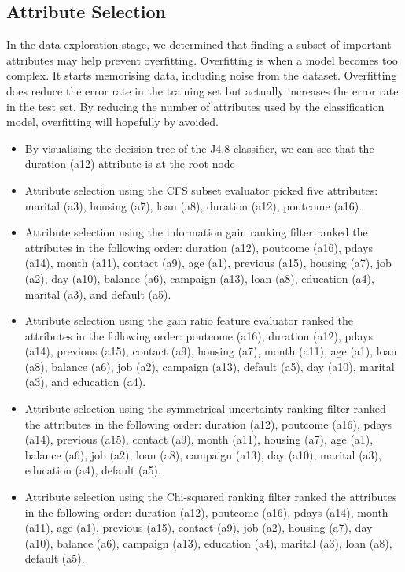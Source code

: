 \documentclass[a4paper,11pt]{article}
\begin{document}
\subsection{Attribute Selection}

In the data exploration stage, we determined that finding a subset of important attributes may help prevent overfitting.
Overfitting is when a model becomes too complex. It starts memorising data, including noise from the dataset. Overfitting
does reduce the error rate in the training set but actually increases the error rate in the test set. By reducing the
number of attributes used by the classification model, overfitting will hopefully by avoided.

\begin{itemize}
  \item{By visualising the decision tree of the J4.8 classifier, we can see that the duration (a12) attribute is at the
  root node}
  \item{Attribute selection using the CFS subset evaluator picked five attributes: marital (a3), housing (a7), loan (a8),
  duration (a12), poutcome (a16).}
  \item{Attribute selection using the information gain ranking filter ranked the attributes in the following order:
  duration (a12), poutcome (a16), pdays (a14), month (a11), contact (a9), age (a1), previous (a15), housing (a7),
  job (a2), day (a10), balance (a6), campaign (a13), loan (a8), education (a4), marital (a3), and default (a5).}
  \item{Attribute selection using the gain ratio feature evaluator ranked the attributes in the following order:
  poutcome (a16), duration (a12), pdays (a14), previous (a15), contact (a9), housing (a7), month (a11), age (a1),
  loan (a8), balance (a6), job (a2), campaign (a13), default (a5), day (a10), marital (a3), and education (a4).}
  \item{Attribute selection using the symmetrical uncertainty ranking filter ranked the attributes in the following order:
  duration (a12), poutcome (a16), pdays (a14), previous (a15), contact (a9), month (a11), housing (a7), age (a1), 
  balance (a6), job (a2), loan (a8), campaign (a13), day (a10), marital (a3), education (a4), default (a5).}
  \item{Attribute selection using the Chi-squared ranking filter ranked the attributes in the following order:
  duration (a12), poutcome (a16), pdays (a14), month (a11), age (a1), previous (a15), contact (a9), job (a2),
  housing (a7), day (a10), balance (a6), campaign (a13), education (a4), marital (a3), loan (a8), default (a5).}
\end{itemize}
\end{document}
